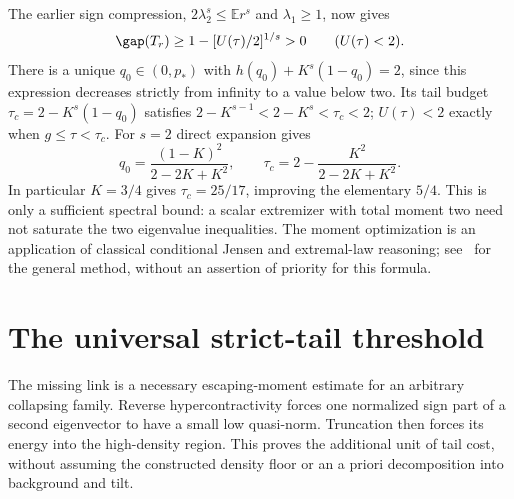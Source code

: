 The earlier sign compression, $2\lambda_2^s\le\mathbb Er^s$ and
$\lambda_1\ge1$, now gives
\[
 \gap(T_r)\ge1-[U(\tau)/2]^{1/s}>0\qquad(U(\tau)<2).
\]
There is a unique $q_0\in(0,p_*)$ with
$h(q_0)+K^s(1-q_0)=2$, since this expression decreases strictly from
infinity to a value below two. Its tail budget
$\tau_c=2-K^s(1-q_0)$ satisfies
$2-K^{s-1}<2-K^s<\tau_c<2$; $U(\tau)<2$ exactly when
$g\le\tau<\tau_c$. For $s=2$ direct expansion gives
\[
 q_0=\frac{(1-K)^2}{2-2K+K^2},\qquad
 \tau_c=2-\frac{K^2}{2-2K+K^2}.
\]
In particular $K=3/4$ gives $\tau_c=25/17$, improving the elementary
$5/4$. This is only a sufficient spectral bound: a scalar extremizer
with total moment two need not saturate the two eigenvalue inequalities.
The moment optimization is an application of classical conditional
Jensen and extremal-law reasoning; see~\cite{BertsimasPopescu} for the
general method, without an assertion of priority for this formula.

\section{The universal strict-tail threshold}\label{sec:universal-tail}
The missing link is a necessary escaping-moment estimate for an arbitrary
collapsing family. Reverse hypercontractivity forces one normalized sign
part of a second eigenvector to have a small low quasi-norm. Truncation
then forces its energy into the high-density region. This proves the
additional unit of tail cost, without assuming the constructed density
floor or an a priori decomposition into background and tilt.

